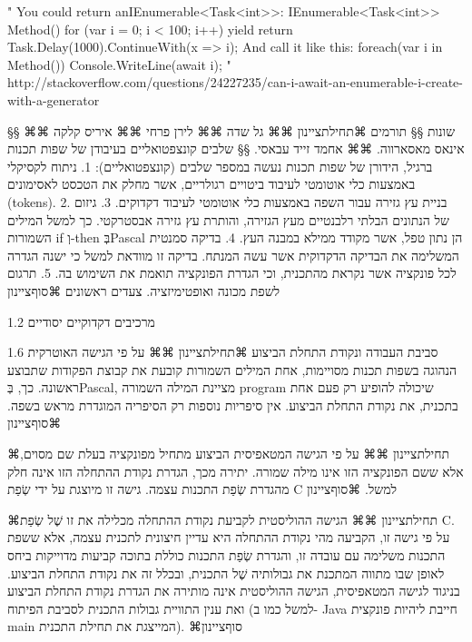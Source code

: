         "
        You could return anIEnumerable<Task<int>>:
        IEnumerable<Task<int>> Method() { for (var i = 0; i < 100; i++) { yield return Task.Delay(1000).ContinueWith(x => i); }}
        And call it like this:
        foreach(var i in Method()) Console.WriteLine(await i);
        "
        http://stackoverflow.com/questions/24227235/can-i-await-an-enumerable-i-create-with-a-generator

        §§ שונות
        §§ תורמים
        ⌘תחילת{ציינון}
        ⌘⌘ גל שדה
        ⌘⌘ לירן פרחי
        ⌘⌘ איריס קלקה
        ⌘⌘ אינאס מאסארווה.
        ⌘⌘ אחמד זייד עבאסי.
        §§ שלבים קונצפטואליים בעיבודן של שפות תכנות
        ברגיל, הידורן של שפות תכנות נעשה במספר שלבים (קונצפטואליים):
        1. ניתוח לקסיקלי באמצעות כלי אוטומטי לעיבוד ביטויים רגולריים, אשר מחלק את הטכסט לאסימונים (tokens).
        2. בניית עץ גזירה עבור השפה באמצעות כלי אוטומטי לעיבוד דקדוקים.
        3. גיזום של הנתונים הבלתי רלבנטיים מעץ הגזירה, והותרת עץ גזירה אבסטרקטי. כך למשל המילים השמורות if וְ-then בְּPascal הן נתון טפל, אשר מקודד ממילא במבנה העץ.
        4. בדיקה סמנטית המשלימה את הבדיקה הדקדוקית אשר עשה המנתח. בדיקה זו מוודאת למשל כי ישנה הגדרה לכל פונקציה אשר נקראת מהתכנית, וכי הגדרת הפונקציה תואמת את השימוש בה.
        5. תרגום לשפת מכונה ואופטימיזציה.
        צעדים ראשונים
    ⌘סוף{ציינון}

        1.2 מרכיבים דקדוקיים יסודיים

        1.6 סביבת העבודה ונקודת התחלת הביצוע
        ⌘תחילת{ציינון}
        ⌘⌘ על פי הגישה האוטרקית הנהוגה בשפות תכנות מסויימות, אחת המילים השמורות קובעת את קבוצת הפקודות שתבוצע ראשונה. כך, בְּPascal, מציינת המילה השמורה program שיכולה להופיע רק פעם אחת בתכנית, את נקודת התחלת הביצוע. אין סיפריות נוספות רק הסיפריה המוגדרת מראש בשפה.
      ⌘סוף{ציינון}

      ⌘תחילת{ציינון}
        ⌘⌘ על פי הגישה המטאפיסית הביצוע מתחיל מפונקציה בעלת שם מסוים, אלא ששם הפונקציה הזו אינו מילה שמורה. יתירה מכך, הגדרת נקודת ההתחלה הזו אינה חלק מהגדרת שְׂפַת התכנות עצמה. גישה זו מיוצגת על ידי שְׂפַת C למשל.
      ⌘סוף{ציינון}

      ⌘תחילת{ציינון}
        ⌘⌘ הגישה ההוליסטית לקביעת נקודת ההתחלה מכלילה את זו שֶׁל שְׂפַת C. על פי גישה זו, הקביעה מהי נקודת ההתחלה היא עדיין חיצונית לתכנית עצמה, אלא ששפת התכנות משלימה עם עובדה זו, והגדרת שְׂפַת התכנות כוללת בתוכה קביעות מדוייקות ביחס לאופן שבו מתווה המתכנת את גבולותיה שֶׁל התכנית, ובכלל זה את נקודת התחלת הביצוע. בניגוד לגישה המטאפיסית, הגישה ההוליסטית אינה מותירה את הגדרת נקודת התחלת הביצוע ואת ענין התוויית גבולות התכנית לסביבת הפיתוח (למשל כמו ב- Java חייבת ליהיות פונקצית main המייצגת את תחילת התכנית).
      ⌘סוף{ציינון}

